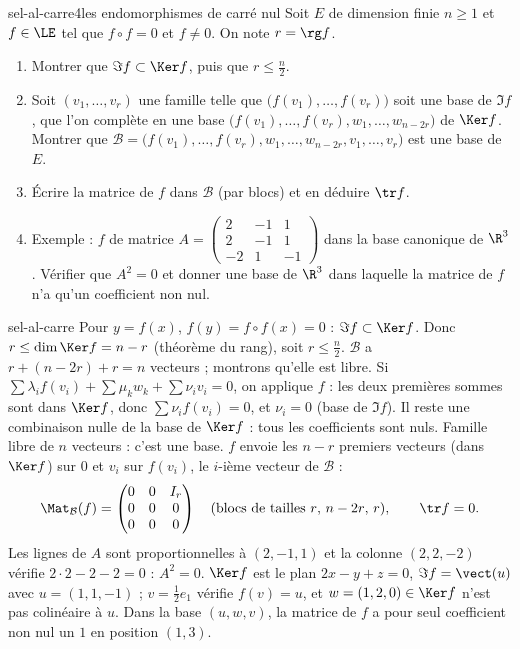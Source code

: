 \begin{exo}{sel-al-carre}{4}{les endomorphismes de carré nul}
Soit $E$ de dimension finie $n\geq1$ et $f\in\LE$ tel que $f\circ f=0$ et $f\neq0$. On note $r=\rg f$.
\begin{enumerate}
\item Montrer que $\Im f\subset\Ker f$, puis que $r\leq\frac n2$.
\item Soit $(v_1,\dots,v_r)$ une famille telle que $\big(f(v_1),\dots,f(v_r)\big)$ soit une base de $\Im f$, que l'on complète en une base
$\big(f(v_1),\dots,f(v_r),w_1,\dots,w_{n-2r}\big)$ de $\Ker f$. Montrer que
$\mathcal B=\big(f(v_1),\dots,f(v_r),w_1,\dots,w_{n-2r},v_1,\dots,v_r\big)$ est une base de $E$.
\item Écrire la matrice de $f$ dans $\mathcal B$ (par blocs) et en déduire $\tr f$.
\item Exemple : $f$ de matrice $A=\begin{pmatrix}2&-1&1\\2&-1&1\\-2&1&-1\end{pmatrix}$ dans la base canonique de $\R^3$. Vérifier que $A^2=0$
et donner une base de $\R^3$ dans laquelle la matrice de $f$ n'a qu'un coefficient non nul.
\end{enumerate}
\end{exo}

\begin{corrige}{sel-al-carre}
 Pour $y=f(x)$, $f(y)=f\circ f(x)=0$ : $\Im f\subset\Ker f$. Donc $r\leq\dim\Ker f=n-r$ (théorème du rang), soit $r\leq\frac n2$.
 $\mathcal B$ a $r+(n-2r)+r=n$ vecteurs ; montrons qu'elle est libre. Si
$\sum\lambda_if(v_i)+\sum\mu_kw_k+\sum\nu_iv_i=0$, on applique $f$ : les deux premières sommes sont dans $\Ker f$, donc
$\sum\nu_if(v_i)=0$, et $\nu_i=0$ (base de $\Im f$). Il reste une combinaison nulle de la base de $\Ker f$ : tous les coefficients
sont nuls. Famille libre de $n$ vecteurs : c'est une base.
 $f$ envoie les $n-r$ premiers vecteurs (dans $\Ker f$) sur $0$ et $v_i$ sur $f(v_i)$, le $i$-ième vecteur de $\mathcal B$ :
\[\Mat_{\mathcal B}(f)=\begin{pmatrix}0&0&I_r\\0&0&0\\0&0&0\end{pmatrix}\quad\text{(blocs de tailles $r$, $n-2r$, $r$)},\qquad\tr f=0.\]
 Les lignes de $A$ sont proportionnelles à $(2,-1,1)$ et la colonne $(2,2,-2)$ vérifie $2\cdot2-2-2=0$ : $A^2=0$. $\Ker f$ est le
plan $2x-y+z=0$, $\Im f=\vect(u)$ avec $u=(1,1,-1)$ ; $v=\frac12e_1$ vérifie $f(v)=u$, et $w=(1,2,0)\in\Ker f$ n'est pas colinéaire à
$u$. Dans la base $(u,w,v)$, la matrice de $f$ a pour seul coefficient non nul un $1$ en position $(1,3)$.
\end{corrige}

